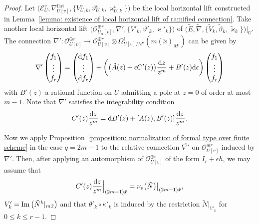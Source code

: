 \documentclass[pdftex]{sigma}
\numberwithin{equation}{section}
\newcommand\im{\mathop{\rm Im}\nolimits}
\begin{document}
\begin{proof}
Let $\big( {\mathcal E}^v_U , \nabla^{\mathrm{flat}}_{U[v]} ,
\big\{ V^v_{U,k} , \vartheta^v_{U,k} , \varkappa^v_{U,k} \big\} \big)$
be the local horizontal lift constructed in
Lemma~\ref{lemma: existence of local horizontal lift of ramified connection}.
Take another local horizontal lift
$\big({\mathcal O}_{U_{\alpha}[v]}^{\oplus r}, \nabla',
\big\{ V'_k,\vartheta'_k,\varkappa'_k \big\} \big)$ of
$\big(\tilde{E},\tilde{\nabla},\big\{\tilde{V}_{k},
\tilde{\vartheta}_{k},\tilde{\varkappa}_{k}\big\}\big)
\big|_{U}$.
The connection
$\nabla' \colon {\mathcal O}_{U[v]}^{\oplus r} \longrightarrow
{\mathcal O}_{U[v]}^{\oplus r}
 \otimes \Omega^1_{U[v]/M'}(m(\tilde{x})_{M'})$
can be given by
\[
 \nabla'
 \begin{pmatrix} f_1 \\ \vdots \\ f_r \end{pmatrix}
 =
 \begin{pmatrix} {\rm d}f_1 \\ \vdots \\ {\rm d}f_r \end{pmatrix}
 +
 \left( \big( \tilde{A}(z)+\epsilon C'(z) \big) \frac {{\rm d}z} {z^m}
 + B'(z) {\rm d}\epsilon
 \right)
 \begin{pmatrix} f_1 \\ \vdots \\ f_r \end{pmatrix}
\]
with $B'(z)$ a rational function on $U$ admitting a pole at
$z=0$ of order at most $m-1$.
Note that $\nabla'$ satisfies the integrability condition
\begin{equation} \label{equation: integrability condition for another local connection}
 C'(z)\frac{{\rm d}z} {z^m} =
 {\rm d} B'(z) + [A(z),B'(z)] \frac{{\rm d}z} {z^m}.
\end{equation}

Now we apply Proposition~\ref{proposition: normalization of formal type over finite scheme}
in the case $q=2m-1$ to the relative connection
$\overline{\nabla'}$
on ${\mathcal O}_{U[v]}^{\oplus r}$
induced by $\nabla'$.
Then, after applying an automorphism of
${\mathcal O}_{U[v]}^{\oplus r}$
of the form $I_r+\epsilon h$,
we may assume that
\begin{equation} \label{equation: condition of exponent for another local horizontal lift}
 C'(z)\frac{{\rm d}z}{z^m}\Big|_{(2m-1)\tilde{x}}
 =
 \nu_v\big(\tilde{N}\big)\big|_{(2m-1)\tilde{x}},
\end{equation}
$V'_k=\im\big(\tilde{N}^k|_{m\tilde{x}}\big)$
and that $\theta'_k\circ\kappa'_k$ is induced by
the restriction $\tilde{N}|_{V'_k}$
for $0\leq k\leq r-1$.


\end{proof}
\end{document}
